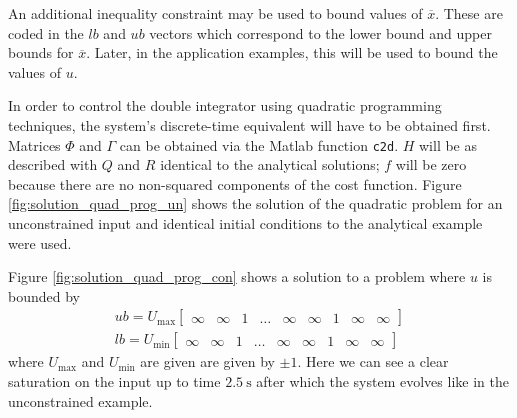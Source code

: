 \par An additional inequality constraint may be used to bound values of $\overline{x}$. These are coded in the $lb$ and $ub$ vectors which correspond to the lower bound and upper bounds for $\overline{x}$. Later, in the application examples, this will be used to bound the values of $u$.


\par In order to control the double integrator using quadratic programming techniques, the system's discrete-time equivalent will have to be obtained first. Matrices $\Phi$ and $\Gamma$ can be obtained via the Matlab function \texttt{c2d}. $H$ will be as described with $Q$ and $R$ identical to the analytical solutions; $f$ will be zero because there are no non-squared components of the cost function. Figure \ref{fig:solution_quad_prog_un} shows the solution of the quadratic problem for an unconstrained input and identical initial conditions to the analytical example were used.

\par Figure \ref{fig:solution_quad_prog_con} shows a solution to a problem where $u$ is bounded by
\begin{equation}
\label{eq:quad_prog_ineq_constr}
\begin{gathered}
    ub = U_{\text{max}} \begin{bmatrix} \infty & \infty & 1 & \ldots & \infty & \infty & 1 & \infty & \infty \end{bmatrix} \\
    lb = U_{\text{min}} \begin{bmatrix} \infty & \infty & 1 & \ldots & \infty & \infty & 1 & \infty & \infty \end{bmatrix} 
\end{gathered}
\end{equation}
where $U_{\text{max}}$ and $U_{\text{min}}$ are given are given by $\pm 1$. Here we can see a clear saturation on the input up to time $\SI{2.5}{\second}$ after which the system evolves like in the unconstrained example.

